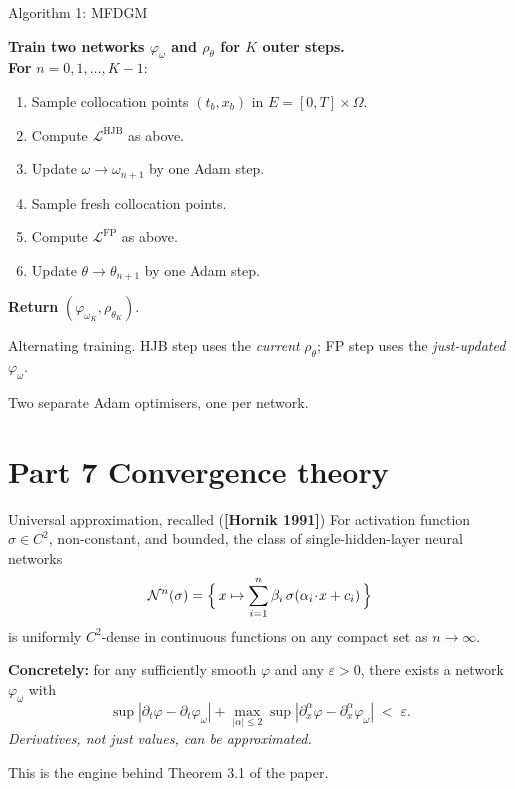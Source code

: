 \documentclass[10pt,aspectratio=169]{beamer}
\newcommand{\teal}[1]{\textcolor{kaustteal}{#1}}
\newcommand{\blue}[1]{\textcolor{kaustblue}{#1}}
\newcommand{\citehl}[1]{\textcolor{kaustblue!80!black}{\textbf{[#1]}}}
\begin{document}
\begin{frame}{Algorithm 1: MFDGM}
\begin{tcolorbox}[colback=kaustblue!5, colframe=kaustblue, arc=3pt]
\textbf{Train two networks $\varphi_\omega$ and $\rho_\theta$ for $K$ outer steps.}\\[4pt]
\textbf{For} $n = 0, 1, \ldots, K-1$:
\begin{enumerate}\setlength\itemsep{2pt}
  \item Sample collocation points $(t_b,x_b)$ in $E = [0,T]\times\Omega$.
  \item Compute $\mathcal{L}^{\text{HJB}}$ as above.
  \item Update $\omega \to \omega_{n+1}$ by one Adam step.
  \item Sample fresh collocation points.
  \item Compute $\mathcal{L}^{\text{FP}}$ as above.
  \item Update $\theta \to \theta_{n+1}$ by one Adam step.
\end{enumerate}
\textbf{Return} $(\varphi_{\omega_K}, \rho_{\theta_K})$.
\end{tcolorbox}

\medskip
\teal{Alternating training.}
HJB step uses the \emph{current} $\rho_\theta$; FP step uses the
\emph{just-updated} $\varphi_\omega$.

\medskip
Two separate Adam optimisers, one per network.
\end{frame}

\section{Part 7 \;\textbar\; Convergence theory}

\begin{frame}{Universal approximation, recalled \;\textnormal{(\citehl{Hornik 1991})}}
For activation function $\sigma \in C^2$, non-constant, and bounded,
the class of single-hidden-layer neural networks
\[
  \mathcal{N}^n(\sigma) = \Bigl\{\,x \mapsto \sum_{i=1}^n \beta_i\,\sigma(\alpha_i\!\cdot\!x + c_i)\,\Bigr\}
\]
is \blue{uniformly $C^2$-dense} in continuous functions on any compact set
as $n \to \infty$.

\medskip
\textbf{Concretely:} for any sufficiently smooth $\varphi$ and any $\varepsilon>0$,
there exists a network $\varphi_\omega$ with
\[
  \sup |\partial_t\varphi - \partial_t\varphi_\omega|
  + \max_{|\alpha|\leq 2} \sup |\partial_x^\alpha\varphi - \partial_x^\alpha\varphi_\omega|
  \;<\; \varepsilon.
\]
\emph{Derivatives, not just values, can be approximated.}

\medskip
This is the engine behind Theorem 3.1 of the paper.
\end{frame}
\end{document}

